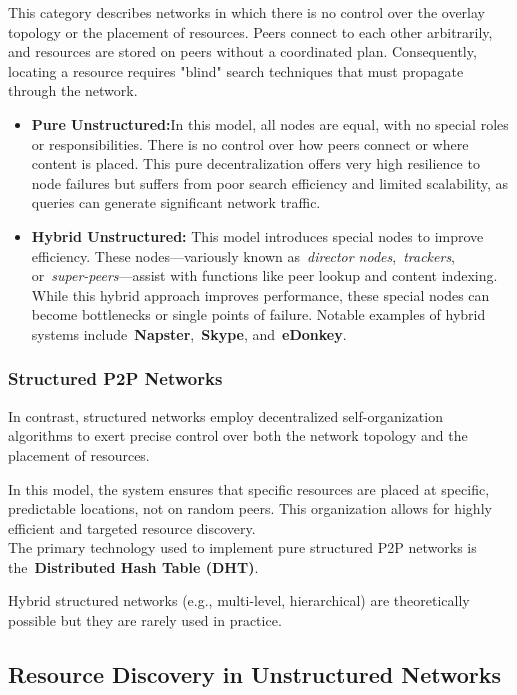 \documentclass{scrbook}
\begin{document}
This category describes networks in which there is no control over the
overlay topology or the placement of resources. Peers connect to each
other arbitrarily, and resources are stored on peers without a
coordinated plan. Consequently, locating a resource requires "blind"
search techniques that must propagate through the network.

\begin{itemize}
    \item
    \textbf{Pure Unstructured:}In this model, all nodes are equal,
    with no special roles or responsibilities. There is no control over how
    peers connect or where content is placed. This pure decentralization
    offers very high resilience to node failures but suffers from poor
    search efficiency and limited scalability, as queries can generate
    significant network traffic.
    
    \item 
    \textbf{Hybrid Unstructured:} This model introduces special nodes
    to improve efficiency. These nodes---variously known as~\emph{director
    nodes},~\emph{trackers}, or~\emph{super-peers}---assist with functions
    like peer lookup and content indexing. While this hybrid approach
    improves performance, these special nodes can become bottlenecks or
    single points of failure. Notable examples of hybrid systems
    include~\textbf{Napster},~\textbf{Skype}, and~\textbf{eDonkey}.
\end{itemize}

\subsubsection{Structured P2P Networks}

In contrast, structured networks employ decentralized self-organization
algorithms to exert precise control over both the network topology and
the placement of resources.

In this model, the system ensures that specific resources are placed at
specific, predictable locations, not on random peers. This organization
allows for highly efficient and targeted resource discovery.\\
The primary technology used to implement pure structured P2P networks is
the~\textbf{Distributed Hash Table (DHT)}.

Hybrid structured networks (e.g., multi-level, hierarchical) are
theoretically possible but they are rarely used in practice.

\subsection{Resource Discovery in Unstructured Networks}
\end{document}
